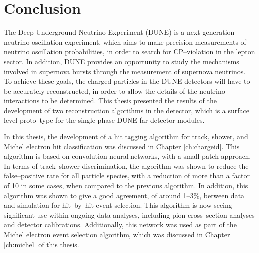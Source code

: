 \chapter{\label{ch:conclusion}Conclusion} 


\minitoc

The Deep Underground Neutrino Experiment (DUNE) is a next generation neutrino
oscillation experiment, which aims to make precision measurements of neutrino
oscillation probabilities, in order to search for CP--violation in the lepton
sector. In addition, DUNE provides an opportunity to study the mechanisms
involved in supernova bursts through the measurement of supernova neutrinos. 
To achieve these goals, the charged particles in the DUNE detectors will have to
be accurately reconstructed, in order to allow the details of the neutrino
interactions to be determined. This thesis presented the results of the
development of two reconstruction algorithms in the \protodune{} detector, which
is a surface level proto--type for the single phase DUNE far detector modules. 

In this thesis, the development of a hit tagging algorithm for track, shower, 
and Michel electron hit classification was discussed in Chapter 
\ref{ch:chargeid}. This algorithm is based on convolution neural networks, 
with a small patch approach. In terms of track--shower discrimination, the 
algorithm was shown to reduce the false--positive rate for all particle 
species, with a reduction of more than a factor of 10 in some cases, when
compared to the previous algorithm. In addition, this algorithm was shown to 
give a good agreement, of around 1--3\%, between data and simulation for 
hit--by--hit event selection. This algorithm is now seeing significant use 
within ongoing \protodune{} data analyses, including pion cross--section 
analyses and detector calibrations.  Additionally, this network was used as 
part of the Michel electron event selection algorithm, which was discussed in 
Chapter \ref{ch:michel} of this thesis.

